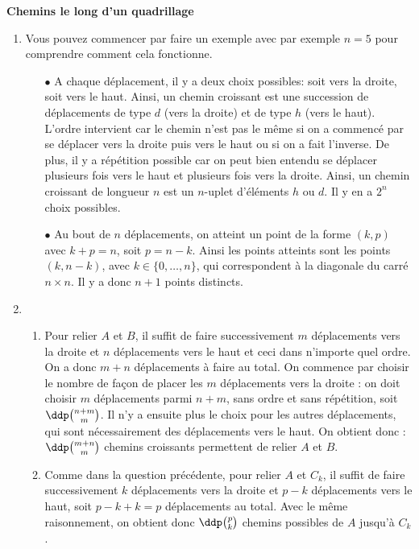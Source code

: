 \documentclass[a4paper, 11pt]{article}
\begin{document}
\begin{correction}  \; \textbf{Chemins le long d'un quadrillage}
	\begin{enumerate}
		\item Vous pouvez commencer par faire un exemple avec par exemple $n=5$ pour comprendre comment cela fonctionne.
		      \begin{itemize}
			      \item[$\bullet$] A chaque d\'eplacement, il y a deux choix possibles: soit vers la droite, soit vers le haut. Ainsi, un chemin croissant est
				      une succession de d\'eplacements de type $d$ (vers la droite) et de type $h$ (vers le haut). L'ordre intervient car le chemin n'est pas le m\^eme si on a commenc\'e par se d\'eplacer vers la droite puis vers le haut ou si on a fait l'inverse. De plus, il y a r\'ep\'etition possible car on peut bien entendu se d\'eplacer plusieurs fois vers le haut et plusieurs fois vers la droite. Ainsi, un chemin croissant de longueur $n$ est un $n$-uplet d'\'el\'ements $h$ ou $d$. Il y en a $2^n$ choix possibles.
			      \item[$\bullet$] Au bout de $n$ d\'eplacements, on atteint un point de la forme $(k,p)$ avec $k+p=n$, soit $p=n-k$. Ainsi les points atteints sont les points $(k,n-k)$, avec $k \in \{0, \ldots, n\}$, qui correspondent \`a la diagonale du carr\'e $n\times n$. Il y a donc $n+1$ points distincts.
		      \end{itemize}
		\item
		      \begin{enumerate}
			      \item Pour relier $A$ et $B$, il suffit de faire successivement $m$ d\'eplacements vers la droite et $n$ d\'eplacements vers le haut et ceci dans n'importe quel ordre. On a donc $m+n$ d\'eplacements \`a faire au total. On commence par choisir le nombre de fa\c con de placer les $m$ d\'eplacements vers la droite : on doit choisir $m$ d\'eplacements parmi $n+m$, sans ordre et sans r\'ep\'etition, soit $\ddp\binom{n+m}{m}$. Il n'y a ensuite plus le choix pour les autres d\'eplacements, qui sont n\'ecessairement des d\'eplacements vers le haut. On obtient donc : $\ddp\binom{m+n}{m}$ chemins croissants permettent de relier $A$ et $B$.\\
			      \item Comme dans la question pr\'ec\'edente, pour relier $A$ et $C_k$, il suffit de faire successivement $k$ d\'eplacements vers la droite et $p-k$ d\'eplacements vers le haut, soit $p-k+k=p$ d\'eplacements au total. Avec le m\^eme raisonnement, on obtient donc $\ddp \binom{p}{k}$ chemins possibles de $A$ jusqu'\`a $C_k$.\\

\end{enumerate}
\end{enumerate}
\end{correction}
\end{document}
